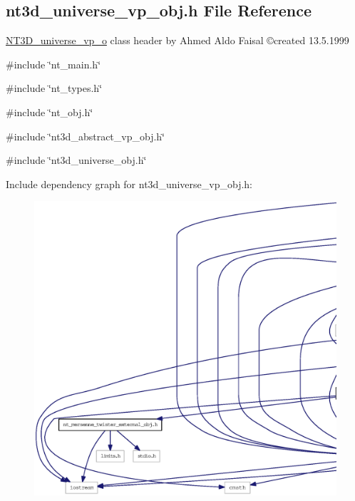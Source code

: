 \subsection{nt3d\_\-universe\_\-vp\_\-obj.h File Reference}
\label{nt3d__universe__vp__obj_8h}



\begin{DoxyItemize}
\item \hyperlink{class_n_t3_d__universe__vp__o}{NT3D\_\-universe\_\-vp\_\-o} class header by Ahmed Aldo Faisal \copyright created 13.5.1999 
\end{DoxyItemize} 


{\ttfamily \#include \char`\"{}nt\_\-main.h\char`\"{}}\par
{\ttfamily \#include \char`\"{}nt\_\-types.h\char`\"{}}\par
{\ttfamily \#include \char`\"{}nt\_\-obj.h\char`\"{}}\par
{\ttfamily \#include \char`\"{}nt3d\_\-abstract\_\-vp\_\-obj.h\char`\"{}}\par
{\ttfamily \#include \char`\"{}nt3d\_\-universe\_\-obj.h\char`\"{}}\par
Include dependency graph for nt3d\_\-universe\_\-vp\_\-obj.h:
\nopagebreak
\begin{figure}[H]
\begin{center}
\leavevmode
\includegraphics[width=400pt]{nt3d__universe__vp__obj_8h__incl}
\end{center}
\end{figure}
